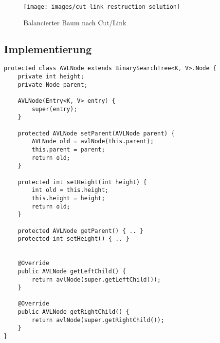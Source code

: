 \begin{figure}[h]
	\centering
	\texttt{[image: images/cut\_link\_restruction\_solution]}
	\caption{Balancierter Baum nach Cut/Link}
	\label{fig:cutlinkrestructionsolution}
\end{figure}



\subsection{Implementierung}
\begin{lstlisting}[caption=AVL Tree Node]
protected class AVLNode extends BinarySearchTree<K, V>.Node {
	private int height;
	private Node parent;

	AVLNode(Entry<K, V> entry) {
		super(entry);
	}

	protected AVLNode setParent(AVLNode parent) {
		AVLNode old = avlNode(this.parent);
		this.parent = parent;
		return old;
	}

	protected int setHeight(int height) {
		int old = this.height;
		this.height = height;
		return old;
	}

	protected AVLNode getParent() { .. }
	protected int setHeight() { .. }


	@Override
	public AVLNode getLeftChild() {
		return avlNode(super.getLeftChild());
	}

	@Override
	public AVLNode getRightChild() {
		return avlNode(super.getRightChild());
	}
}
\end{lstlisting}

